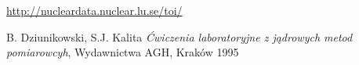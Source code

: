 \documentclass{article}
\begin{document}
\begin{thebibliography}{9}
	
	
	\url{http://nucleardata.nuclear.lu.se/toi/}

	
	B. Dziunikowski, S.J. Kalita
	\emph{Ćwiczenia laboratoryjne z jądrowych metod pomiarowcyh}, Wydawnictwa AGH, Kraków 1995
	
\end{thebibliography}
\vspace{2cm}
\end{document}
